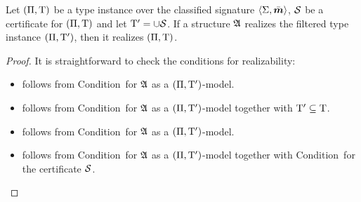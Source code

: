\begin{remark}\label{rem:filtered-realiz}
Let $(\Pi,\mathrm{T})$ be a type instance over the classified signature
$\left\langle \mathrm{\Sigma},\bar{\bm{m}} \right\rangle$, $\mathcal{S}$ be a certificate for $(\Pi,\mathrm{T})$ and let
${\mathrm{T}'} = \cup\mathcal{S}$. If a structure $\mathfrak{A}$ realizes the
filtered type instance $(\Pi,{\mathrm{T}'})$, then it realizes $(\Pi,\mathrm{T})$.
\end{remark}
\begin{proof}
It is straightforward to check the conditions for realizability:
\begin{itemize}
  \item[\refcondrealizI] follows from Condition~ for $\mathfrak{A}$ as a
  $(\Pi,{\mathrm{T}'})$-model.
  \item[\refcondrealizII] follows from Condition~ for $\mathfrak{A}$ as
  a $(\Pi,{\mathrm{T}'})$-model together with ${\mathrm{T}'} \subseteq \mathrm{T}$.
  \item[\refcondrealizp] follows from Condition~ for $\mathfrak{A}$ as a
  $(\Pi,{\mathrm{T}'})$-model.
  \item[\refcondrealizk] follows from Condition~ for $\mathfrak{A}$ as a
  $(\Pi,{\mathrm{T}'})$-model together with Condition~ for the
  certificate $\mathcal{S}$.
\end{itemize}
\end{proof}

